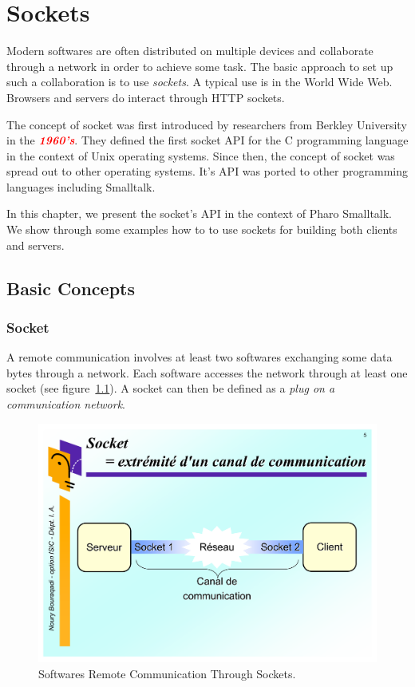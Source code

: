 \documentclass[a4paper,10pt,twoside]{book}
\begin{document}
	\renewcommand{\nnbb}[2]{} %
	\sloppy
\fi
\newcommand{\nouryComment}[1]{\textcolor{red}{\textbf{\emph{#1}}}}


\chapter{Sockets}\label{cha:sockets}
Modern softwares are often distributed on multiple devices and collaborate through a network in order to achieve some task.
The basic approach to set up such a collaboration is to use {\em sockets}.
A typical use is in the World Wide Web.
Browsers and servers do interact through HTTP sockets.

The concept of socket was first introduced by researchers from Berkley University in the \nouryComment{1960's}.
They defined the first socket API for the C programming language in the context of Unix operating systems.
Since then, the concept of socket was spread out to other operating systems.
It's API was ported to other programming languages including Smalltalk.

In this chapter, we present the socket's API in the context of Pharo Smalltalk.
We show through some examples how to to use sockets for building both clients and servers.

\section{Basic Concepts}
\subsection{Socket}
A remote communication involves at least two softwares exchanging some data bytes through a network.
Each software accesses the network through at least one socket (see figure~\ref{fig:socketConcept}).
A socket can then be defined as a {\em plug on a communication network}.

\begin{figure}[ht]\centering
	\includegraphics[width=.75\linewidth]{socketConcept.pdf}
	\caption{Softwares Remote Communication Through Sockets.}
	\label{fig:socketConcept}
\end{figure}
\end{document}
